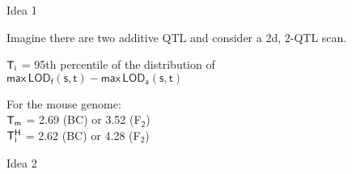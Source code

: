 \documentclass[12pt]{article}
\newcommand{\headsize}{\fontsize{35}{35} \selectfont}
\newcommand{\smallersize}{\fontsize{20}{25} \selectfont}
\newcommand{\lod}{\text{LOD}}
\begin{document}
\newpage


\headsize \color{myyellow}
\hfill \begin{minipage}{5.75in}
\centering
Idea 1
\end{minipage}

\vspace{3cm} \color{mywhite} \smallersize

\hfill \begin{minipage}{10in}

Imagine there are two additive QTL and consider a 2d, 2-QTL scan.

\vspace{1cm}

\hspace*{0.5in} $\mathsf{\color{mypink} T_i}$ = 95th percentile of the
  distribution of \\[6pt]
\hspace*{1.3in} {\color{myblue} $\mathsf{ \text{max} \, \lod_f(s,t) -
    \text{max} \, \lod_a(s,t)}$}


\vspace{2cm}

For the mouse genome: \\[12pt]
\hspace*{0.5in} $\mathsf{\color{mypink} T_m}$ = {\color{myblue}
  2.69} (BC) or {\color{myblue} 3.52} (F$_{\mathsf{2}}$) \\[12pt]
\hspace*{0.5in} $\mathsf{\color{mypink} T^H_i}$ = {\color{myblue}
  2.62} (BC) or {\color{myblue} 4.28} (F$_{\mathsf{2}}$)


\end{minipage}






\newpage


\headsize \color{myyellow}
\hfill \begin{minipage}{5.75in}
\centering
Idea 2
\end{minipage}

\vspace{3cm} \color{mywhite} \smallersize
\end{document}
